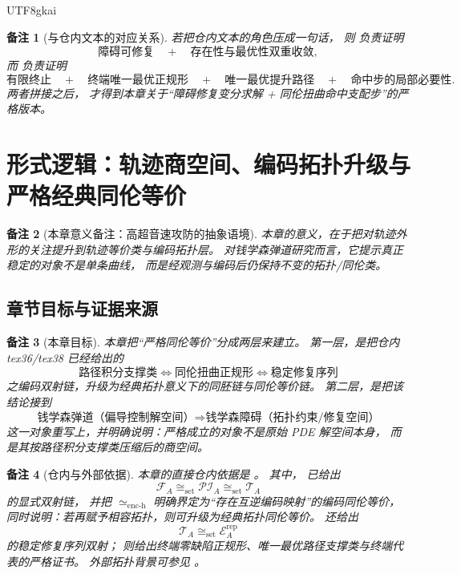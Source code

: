 \documentclass[12pt]{article}
\newtheorem{remark}{备注}[section]
\begin{document}
\begin{CJK*}{UTF8}{gkai}
\begin{remark}[与仓内文本的对应关系]
若把仓内文本的角色压成一句话，
则 \cite{RepoTex36HomotopyTwistEquivalence,RepoTex41HomotopyRepairBundle}
负责证明
\[
  \text{障碍可修复}
  \quad+\quad
  \text{存在性与最优性双重收敛},
\]
而 \cite{RepoTex38JacobiBianchiRepair,RepoTex39OpenRepairFamily}
负责证明
\[
  \text{有限终止}
  \quad+\quad
  \text{终端唯一最优正规形}
  \quad+\quad
  \text{唯一最优提升路径}
  \quad+\quad
  \text{命中步的局部必要性}.
\]
两者拼接之后，
才得到本章关于“障碍修复变分求解 + 同伦扭曲命中支配步”的严格版本。
\end{remark}

\clearpage
\section{形式逻辑：轨迹商空间、编码拓扑升级与严格经典同伦等价}
\label{sec:tex1-ch7}

\begin{remark}[本章意义备注：高超音速攻防的抽象语境]
本章的意义，在于把对轨迹外形的关注提升到轨迹等价类与编码拓扑层。
对钱学森弹道研究而言，它提示真正稳定的对象不是单条曲线，
而是经观测与编码后仍保持不变的拓扑/同伦类。
\end{remark}

\subsection{章节目标与证据来源}
\label{subsec:tex1-ch7-goal}

\begin{remark}[本章目标]
本章把“严格同伦等价”分成两层来建立。
第一层，是把仓内 tex36/tex38 已经给出的
\[
  \text{路径积分支撑类}
  \Longleftrightarrow
  \text{同伦扭曲正规形}
  \Longleftrightarrow
  \text{稳定修复序列}
\]
之编码双射链，升级为经典拓扑意义下的同胚链与同伦等价链。
第二层，是把该结论接到
\[
  \text{钱学森弹道（偏导控制解空间）}
  \Longrightarrow
  \text{钱学森障碍（拓扑约束/修复空间）}
\]
这一对象重写上，并明确说明：严格成立的对象不是原始 PDE 解空间本身，
而是其按路径积分支撑类压缩后的商空间。
\end{remark}

\begin{remark}[仓内与外部依据]
本章的直接仓内依据是
\cite{RepoTex36HomotopyTwistEquivalence,RepoTex38JacobiBianchiRepair}。
其中，
\cite{RepoTex36HomotopyTwistEquivalence}
已给出
\[
  \mathcal F_A \cong_{\mathrm{set}} \mathcal{PI}_A \cong_{\mathrm{set}} \mathcal T_A
\]
的显式双射链，
并把 \(\simeq_{\mathrm{enc\text{-}h}}\) 明确界定为“存在互逆编码映射”的编码同伦等价，
同时说明：若再赋予相容拓扑，则可升级为经典拓扑同伦等价。
\cite{RepoTex36HomotopyTwistEquivalence}
还给出
\[
  \mathcal T_A \cong_{\mathrm{set}} \mathcal E_A^{\mathrm{rep}}
\]
的稳定修复序列双射；
\cite{RepoTex38JacobiBianchiRepair}
则给出终端零缺陷正规形、唯一最优路径支撑类与终端代表的严格证书。
外部拓扑背景可参见 \cite{Hatcher2002AT,Husemoller1994FibreBundles}。
\end{remark}


\end{CJK*}
\end{document}
